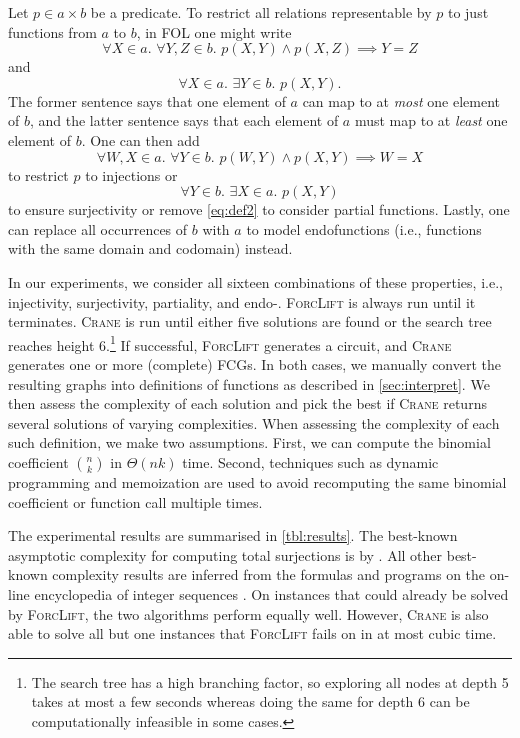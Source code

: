 \documentclass[letterpaper]{article} %
\theoremstyle{definition}
\theoremstyle{remark}
\begin{document}
Let $p \in a \times b$ be a predicate. To restrict all relations representable
by $p$ to just functions from $a$ to $b$, in FOL one might write
\[
  \forall X \in a\text{. }\forall Y, Z \in b\text{. }p(X, Y) \land p(X, Z) \implies Y = Z
\]
and
\begin{equation}\label{eq:def2}
  \forall X \in a\text{. }\exists Y \in b\text{. }p(X, Y).
\end{equation}
The former sentence says that one element of $a$ can map to at \emph{most} one
element of $b$, and the latter sentence says that each element of $a$ must map
to at \emph{least} one element of $b$. One can then add
\[
  \forall W, X \in a\text{. }\forall Y \in b\text{. }p(W, Y) \land p(X, Y) \implies W = X
\]
to restrict $p$ to injections or
\[
  \forall Y \in b\text{. }\exists X \in a\text{. }p(X, Y)
\]
to ensure surjectivity or remove \cref{eq:def2} to consider partial functions.
Lastly, one can replace all occurrences of $b$ with $a$ to model endofunctions
(i.e., functions with the same domain and codomain) instead.

In our experiments, we consider all sixteen combinations of these properties,
i.e., injectivity, surjectivity, partiality, and endo-. \textsc{ForcLift} is
always run until it terminates. \textsc{Crane} is run until either five
solutions are found or the search tree reaches height 6.\footnote{The search
  tree has a high branching factor, so exploring all nodes at depth 5 takes at
  most a few seconds whereas doing the same for depth 6 can be computationally
  infeasible in some cases.} If successful, \textsc{ForcLift} generates a
circuit, and \textsc{Crane} generates one or more (complete) FCGs. In both
cases, we manually convert the resulting graphs into definitions of functions as
described in \cref{sec:interpret}. We then assess the complexity of each
solution and pick the best if \textsc{Crane} returns several solutions of
varying complexities. When assessing the complexity of each such definition, we
make two assumptions. First, we can compute the binomial coefficient
$\binom{n}{k}$ in $\Theta(nk)$ time. Second, techniques such as dynamic
programming and memoization are used to avoid recomputing the same binomial
coefficient or function call multiple times.

The experimental results are summarised in \cref{tbl:results}. The best-known
asymptotic complexity for computing total surjections is by \citet{30049}. All
other best-known complexity results are inferred from the formulas and programs
on the on-line encyclopedia of integer sequences \citep{oeis}. On instances that
could already be solved by \textsc{ForcLift}, the two algorithms perform equally
well. However, \textsc{Crane} is also able to solve all but one instances that
\textsc{ForcLift} fails on in at most cubic time.
\end{document}
